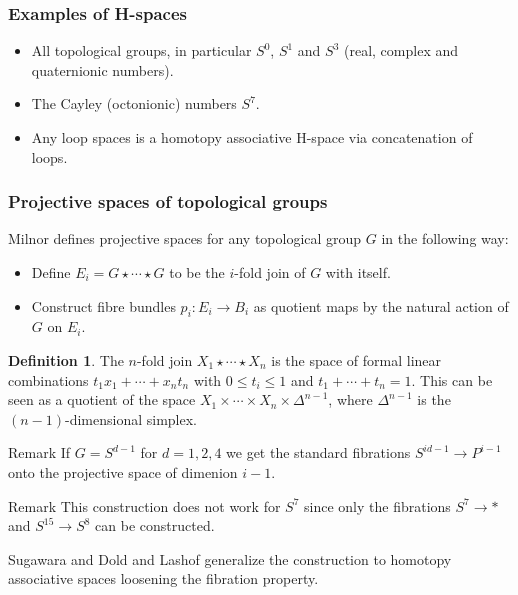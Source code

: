 \documentclass{beamer}
\theoremstyle{definition}
\newtheorem{defi}{Definition}
\begin{document}
\begin{frame}
\frametitle{Examples of H-spaces}
\begin{itemize}
\item<1-> All topological groups, in particular $S^0$, $S^1$ and $S^3$ (real, complex and quaternionic numbers).
\item<2-> The Cayley (octonionic) numbers $S^7$.
\item<3-> Any loop spaces is a homotopy associative H-space via concatenation of loops.
\end{itemize}
	
\end{frame}

\begin{frame}
\frametitle{Projective spaces of topological groups}
Milnor defines projective spaces for any topological group $G$ in the following way:\pause
\begin{itemize}
\item<2-> Define $E_i=G\star\cdots\star G$ to be the $i$-fold join of $G$ with itself. 
\item<2-> Construct fibre bundles $p_i:E_i\to B_i$ as quotient maps by the natural action of $G$ on $E_i$.
\end{itemize}\pause
\begin{defi}
The $n$-fold join $X_1\star\cdots\star X_n$ is the space of formal linear combinations $t_1x_1+\cdots+x_nt_n$ with $0\leq t_i\leq 1$ and $t_1+\cdots+t_n=1$. This can be seen as a quotient of the space $X_1\times\cdots\times X_n\times\Delta^{n-1}$, where $\Delta^{n-1}$ is the $(n-1)$-dimensional simplex.
\end{defi}\pause

\end{frame}

\begin{frame}
\begin{block}{Remark}
If $G=S^{d-1}$ for $d=1,2,4$ we get the standard fibrations $S^{id-1}\to P^{i-1}$ onto the projective space of dimenion $i-1$.
\end{block}\pause
\begin{block}{Remark}
This construction does not work for $S^7$ since only the fibrations $S^7\to *$ and $S^{15}\to S^8$ can be constructed.
\end{block}\pause


Sugawara and Dold and Lashof generalize the construction to homotopy associative spaces loosening the fibration property.
\end{frame}
\end{document}
